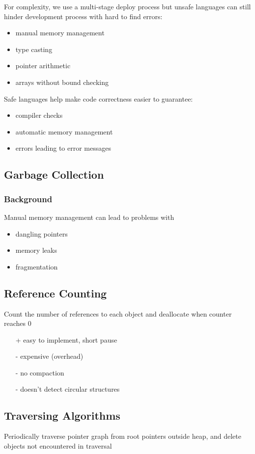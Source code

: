 \documentclass[]{article}
\theoremstyle{definition}
\begin{document}
	For complexity, we use a multi-stage deploy process but unsafe languages can still hinder development process with hard to find errors:
	\begin{itemize}
		\item manual memory management
		\item type casting
		\item pointer arithmetic
		\item arrays without bound checking
	\end{itemize}
	Safe languages help make code correctness easier to guarantee:
	\begin{itemize}
		\item compiler checks
		\item automatic memory management
		\item errors leading to error messages
	\end{itemize}

	\subsection{Garbage Collection}
	\subsubsection{Background}
	Manual memory management can lead to problems with
	\begin{itemize}
		\item dangling pointers
		\item memory leaks
		\item fragmentation
	\end{itemize}

	\subsection{Reference Counting}
	Count the number of references to each object and deallocate when counter reaches 0
	\begin{itemize}
		\item[+] easy to implement, short pause
		\item[-] expensive (overhead)
		\item[-] no compaction
		\item[-] doesn't detect circular structures
	\end{itemize}

	\subsection{Traversing Algorithms}
	Periodically traverse pointer graph from root pointers outside heap, and delete objects not encountered in traversal
\end{document}
